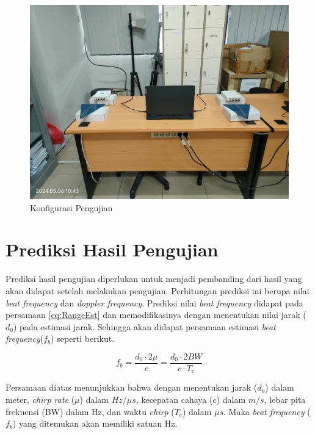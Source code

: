 \begin{figure}
	\begin{center}
		\includegraphics[scale=0.09]{pics/bab3/konfigurasiPengujian.jpg}
		\caption{Konfigurasi Pengujian}
		\label{img:konfigurasi}
	\end{center}
\end{figure}


\section{Prediksi Hasil Pengujian}

Prediksi hasil pengujian diperlukan untuk menjadi pembanding dari hasil yang akan didapat setelah melakukan pengujian. Perhitungan prediksi ini berupa nilai \textit{beat frequency} dan \textit{doppler frequency}. Prediksi nilai \textit{beat frequency} didapat pada persamaan \ref{eq:RangeEst} dan memodifikasinya dengan menentukan nilai jarak ($d_{0}$) pada estimasi jarak. Sehingga akan didapat persamaan estimasi \textit{beat frequency}($f_{b}$) seperti berikut.

\begin{equation}
	\nonumber
	f_{b} = \frac{d_{0} \cdot 2 \mu}{c} = \frac{d_{0} \cdot 2BW}{c \cdot T_{c}}
	\label{eq:predFb}
\end{equation}

Persamaan diatas menunjukkan bahwa dengan menentukan jarak ($d_{0}$) dalam meter, \textit{chirp rate} ($\mu$) dalam $Hz/\mu s$, kecepatan cahaya (c) dalam $m/s$, lebar pita frekuensi (BW) dalam Hz, dan waktu \textit{chirp} ($T_{c}$) dalam $\mu s$. Maka \textit{beat frequency} ($f_{b}$) yang ditemukan akan memiliki satuan Hz.


